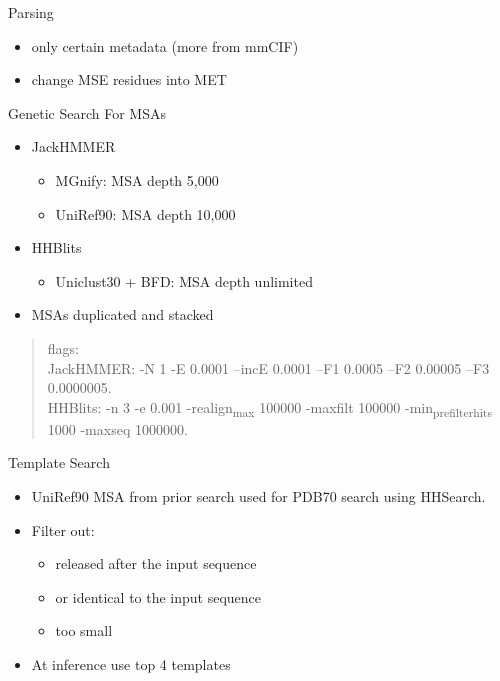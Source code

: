 \documentclass[presentation, smaller]{beamer}
\begin{document}
\begin{frame}[label={sec:orgab82f01}]{Parsing \cite{jumperHighlyAccurateProtein2021}}
\begin{itemize}
\item only certain metadata (more from mmCIF)
\item change MSE residues into MET
\end{itemize}
\end{frame}

\begin{frame}[label={sec:org7d4badc}]{Genetic Search \cite{jumperHighlyAccurateProtein2021}}
For MSAs
\begin{itemize}
\item JackHMMER
\begin{itemize}
\item MGnify: MSA depth 5,000
\item UniRef90: MSA depth 10,000
\end{itemize}
\item HHBlits
\begin{itemize}
\item Uniclust30 + BFD: MSA depth unlimited
\end{itemize}
\item MSAs duplicated and stacked
\end{itemize}

\begin{quote}
flags: \\
  JackHMMER: -N 1 -E 0.0001 --incE 0.0001 --F1 0.0005 --F2 0.00005 --F3 0.0000005. \\
  HHBlits: -n 3 -e 0.001 -realign\textsubscript{max} 100000 -maxfilt 100000 -min\textsubscript{prefilter}\textsubscript{hits} 1000 -maxseq 1000000.
\end{quote}
\end{frame}

\begin{frame}[label={sec:orge7ae846}]{Template Search \cite{jumperHighlyAccurateProtein2021}}
\begin{itemize}
\item UniRef90 MSA from prior search used for PDB70 search using HHSearch.
\item Filter out:
\begin{itemize}
\item released after the input sequence
\item or identical to the input sequence
\item too small
\end{itemize}
\item At inference use top 4 templates
\end{itemize}
\end{frame}
\end{document}
